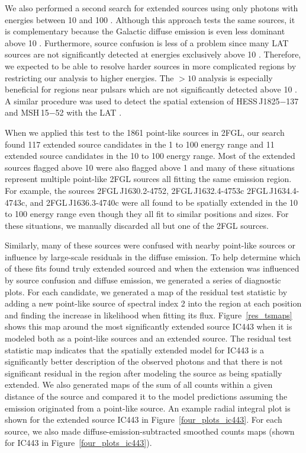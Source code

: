 \documentclass[12pt,preprint]{aastex}
\newcommand{\gev}{\text{GeV}\xspace}
\begin{document}
We also performed a second search for extended sources using only photons
with energies between 10 \gev and 100 \gev.  Although this approach
tests the same sources, it is complementary because the Galactic
diffuse emission is even less dominant above 10 \gev. Furthermore,
source confusion is less of a problem since many LAT sources are not
significantly detected at energies exclusively above 10 \gev. Therefore,
we expected to be able to resolve harder sources in more complicated
regions by restricting our analysis to higher energies.  The $>10$ \gev
analysis is especially beneficial for regions near pulsars which are
not significantly detected above 10 \gev. A similar procedure was used
to detect the spatial extension of HESS\,J1825$-$137 and MSH\,15$-$52
with the LAT \citep{msh1552,fermi_hess_j1825}.

When we applied this test to the 1861 point-like sources in 2FGL, our
search found 117 extended source candidates in the 1 \gev to 100 \gev
energy range and 11 extended source candidates in the 10 \gev to 100
\gev energy range. Most of the extended sources flagged above 10 \gev were
also flagged above 1 \gev and many of these situations represent multiple
point-like 2FGL sources all fitting the same emission region. For example,
the sources 2FGL\,J1630.2-4752, 2FGL\,J1632.4-4753c 2FGL\,J1634.4-4743c,
and 2FGL\,J1636.3-4740c were all found to be spatially extended in the
10 \gev to 100 \gev energy range even though they all fit to similar
positions and sizes.  For these situations, we manually discarded all
but one of the 2FGL sources.

Similarly, many of these sources were confused with nearby
point-like sources or influence by large-scale residuals in the
diffuse emission.  To help determine which of these fits found
truly extended sourced and when the extension was
influenced by source confusion and diffuse emission, we generated a
series of diagnostic plots.  For each candidate, we generated a map
of the residual test statistic by adding a new point-like source of spectral index 2 into the
region at each position and finding the increase in likelihood when fitting
its flux. Figure~\ref{res_tsmaps} shows this map around the
most significantly extended source IC443 when it is modeled both as a
point-like sources and an extended source.  The residual test statistic
map indicates
that the spatially extended model for IC443 is a significantly better
description of the observed photons and that there is not significant
residual in the region after modeling the source as being spatially extended.
We also generated maps of the sum of all counts within a given distance of
the source and compared it to the model predictions assuming the emission
originated from a point-like source.  An example radial integral plot
is shown for the extended source IC443 in Figure~\ref{four_plots_ic443}.
For each source, we also made diffuse-emission-subtracted smoothed counts
maps (shown for IC443 in Figure~\ref{four_plots_ic443}).
\end{document}
